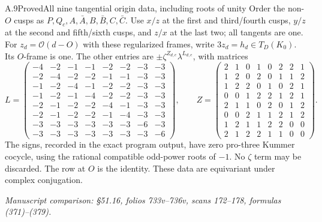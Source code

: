 \begin{statement}{A.9}{Proved}{All nine tangential origin data, including roots of unity}
Order the non-$O$ cusps as $P,Q_c,A,\bar A,B,\bar B,C,\bar C$.
Use $x/z$ at the first and third/fourth cusps, $y/z$ at the second
and fifth/sixth cusps, and $z/x$ at the last two; all tangents are
one. For $z_d=\mathcal O(d-O)$ with these regularized frames,
write $3z_d=h_d\in T_D(K_0)$. Its $O$-frame is one. The other
entries are $\pm\zeta^{Z_{d,e}}\lambda^{L_{d,e}}$, with matrices
\[
 L=\begin{pmatrix}
-4 & -2 & -1 & -1 & -2 & -2 & -3 & -3 \\
-2 & -4 & -2 & -2 & -1 & -1 & -3 & -3 \\
-1 & -2 & -4 & -1 & -2 & -2 & -3 & -3 \\
-1 & -2 & -1 & -4 & -2 & -2 & -3 & -3 \\
-2 & -1 & -2 & -2 & -4 & -1 & -3 & -3 \\
-2 & -1 & -2 & -2 & -1 & -4 & -3 & -3 \\
-3 & -3 & -3 & -3 & -3 & -3 & -6 & -3 \\
-3 & -3 & -3 & -3 & -3 & -3 & -3 & -6
 \end{pmatrix},\qquad
 Z=\begin{pmatrix}
2 & 1 & 0 & 1 & 0 & 2 & 2 & 1 \\
1 & 2 & 0 & 2 & 0 & 1 & 1 & 2 \\
1 & 2 & 2 & 0 & 1 & 0 & 2 & 1 \\
0 & 0 & 1 & 2 & 2 & 1 & 2 & 1 \\
2 & 1 & 1 & 0 & 2 & 0 & 1 & 2 \\
0 & 0 & 2 & 1 & 1 & 2 & 1 & 2 \\
1 & 2 & 1 & 1 & 2 & 2 & 0 & 0 \\
2 & 1 & 2 & 2 & 1 & 1 & 0 & 0
 \end{pmatrix}.
 \tag{A.9.1}
\]
The signs, recorded in the exact program output, have zero pro-three
Kummer cocycle, using the rational compatible odd-power roots of
$-1$. No $\zeta$ term may be discarded. The row at $O$ is the
identity. These data are equivariant under complex conjugation.
\par\smallskip\noindent\emph{Manuscript comparison: \S51.16,
folios 733v--736v, scans 172--178, formulas (371)--(379).}
\end{statement}
